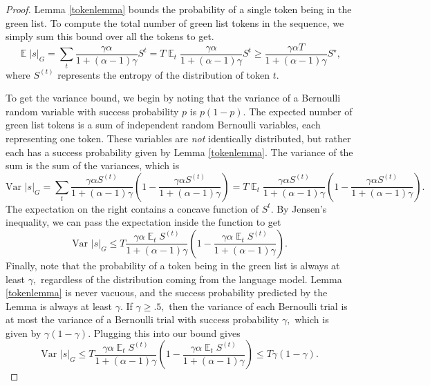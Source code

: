 \documentclass{article}
\theoremstyle{plain}
\theoremstyle{definition}
\theoremstyle{remark}
\DeclareMathOperator*{\expect}{\mathbb{E}}
\begin{document}
\begin{proof}
Lemma \ref{tokenlemma} bounds the probability of a single token being in the green list.  To compute the total number of green list tokens in the sequence, we simply sum this bound over all the tokens to get.  
 $$ \expect |s|_G  = \sum_t \frac{\gamma\alpha}{ 1+(\alpha-1)\gamma} S^{t}  = T \expect_t \frac{\gamma\alpha}{  1+(\alpha-1)\gamma } S^{t} 
 \ge 
 \frac{\gamma\alpha T}{ 1+(\alpha-1)\gamma} S^\star,$$
where $S^{(t)}$ represents the entropy of the distribution of token $t$.

To get the variance bound, we begin by noting that the variance of a Bernoulli random variable with success probability $p$ is $p(1-p).$   The expected number of green list tokens is a sum of independent random Bernoulli variables, each representing one token. These variables are {\em not} identically distributed, but rather each has a success probability given by Lemma \ref{tokenlemma}.  The variance of the sum is the sum of the variances, which is
$$ \text{Var}\,\, |s|_G =
\sum_t \frac{\gamma\alpha S^{(t)} }{ 1+(\alpha-1)\gamma}  \left(1-\frac{\gamma\alpha S^{(t)}}{  1+(\alpha-1)\gamma} \right)
= T \expect_t \frac{\gamma\alpha S^{(t)} }{  1+(\alpha-1)\gamma}  \left(1-\frac{\gamma\alpha S^{(t)} }{  1+(\alpha-1)\gamma} \right).  
$$
The expectation on the right contains a concave function of $S^{t}.$ By Jensen's inequality, we can pass the expectation inside the function to get
$$ \text{Var}\,\, |s|_G \le
T  \frac{\gamma\alpha  \expect_t S^{(t)} }{  1+(\alpha-1)\gamma}  \left(1-\frac{\gamma\alpha \expect_t S^{(t)} }{  1+(\alpha-1)\gamma } \right).  
$$
Finally, note that the probability of a token being in the green list is always at least $\gamma,$ regardless of the distribution coming from the language model.  Lemma \ref{tokenlemma} is never vacuous, and the success probability predicted by the Lemma is always at least $\gamma$.  If $\gamma\ge .5,$ then the variance of each Bernoulli trial is at most the variance of a Bernoulli trial with success probability $\gamma,$ which is given by $\gamma(1-\gamma).$  Plugging this into our bound gives  
 $$ \text{Var}\,\, |s|_G \le
T  \frac{\gamma\alpha  \expect_t S^{(t)} }{  1+(\alpha-1)\gamma}  \left(1-\frac{\gamma\alpha \expect_t S^{(t)} }{  1+(\alpha-1)\gamma} \right) \le T \gamma(1-\gamma).  
$$
\end{proof}
\end{document}

